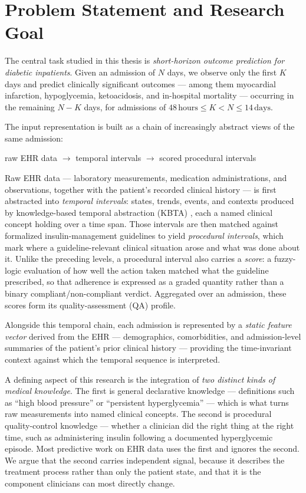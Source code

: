 \section{Problem Statement and Research Goal}

The central task studied in this thesis is \emph{short-horizon outcome prediction for diabetic inpatients}. Given an admission of $N$ days, we observe only the first $K$ days and predict clinically significant outcomes --- among them myocardial infarction, hypoglycemia, ketoacidosis, and in-hospital mortality --- occurring in the remaining $N-K$ days, for admissions of $48\,\text{hours} \le K < N \le 14\,\text{days}$.

The input representation is built as a chain of increasingly abstract views of the same admission:
%
\begin{center}
raw EHR data $\rightarrow$ temporal intervals $\rightarrow$ scored procedural intervals
\end{center}
%
Raw EHR data --- laboratory measurements, medication administrations, and observations, together with the patient's recorded clinical history --- is first abstracted into \emph{temporal intervals}: states, trends, events, and contexts produced by knowledge-based temporal abstraction (KBTA) \citep{shahar1997framework}, each a named clinical concept holding over a time span. Those intervals are then matched against formalized insulin-management guidelines to yield \emph{procedural intervals}, which mark where a guideline-relevant clinical situation arose and what was done about it. Unlike the preceding levels, a procedural interval also carries a \emph{score}: a fuzzy-logic evaluation of how well the action taken matched what the guideline prescribed, so that adherence is expressed as a graded quantity rather than a binary compliant/non-compliant verdict. Aggregated over an admission, these scores form its quality-assessment (QA) profile.

Alongside this temporal chain, each admission is represented by a \emph{static feature vector} derived from the EHR --- demographics, comorbidities, and admission-level summaries of the patient's prior clinical history --- providing the time-invariant context against which the temporal sequence is interpreted.

A defining aspect of this research is the integration of \emph{two distinct kinds of medical knowledge}. The first is general declarative knowledge --- definitions such as ``high blood pressure'' or ``persistent hyperglycemia'' --- which is what turns raw measurements into named clinical concepts. The second is procedural quality-control knowledge --- whether a clinician did the right thing at the right time, such as administering insulin following a documented hyperglycemic episode. Most predictive work on EHR data uses the first and ignores the second. We argue that the second carries independent signal, because it describes the treatment process rather than only the patient state, and that it is the component clinicians can most directly change.

